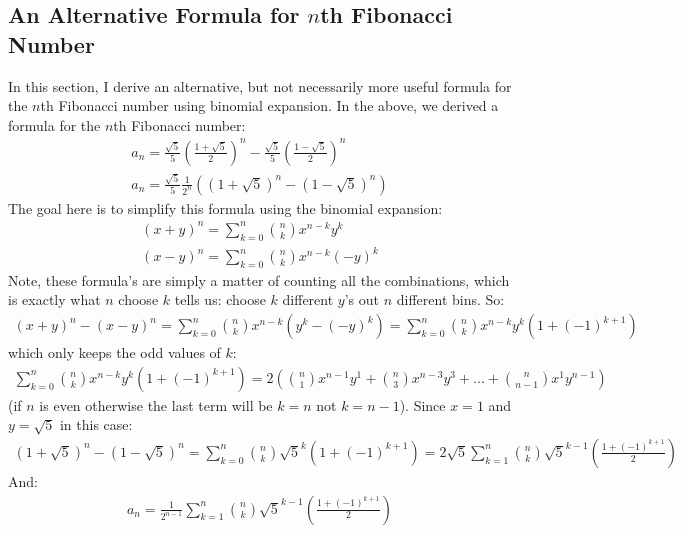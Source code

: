 \documentclass{article}
\begin{document}
\subsection*{An Alternative Formula for $n$th Fibonacci Number}
In this section, I derive an alternative, but not necessarily more useful formula for the $n$th Fibonacci number using binomial expansion. In the above, we derived a formula for the $n$th Fibonacci number:
\begin{gather*}
	a_{n} = \frac{\sqrt{5}}{5}\left(\frac{1 + \sqrt{5}}{2}\right)^{n} -\frac{\sqrt{5}}{5}\left(\frac{1 - \sqrt{5}}{2}\right)^{n}\\
	a_{n} = \frac{\sqrt{5}}{5}\frac{1}{2^{n}}\left(\left(1 + \sqrt{5}\right)^{n} - \left(1 - \sqrt{5}\right)^{n}\right) 
\end{gather*}
The goal here is to simplify this formula using the binomial expansion:
\begin{gather*}
	(x + y)^{n} = \sum_{k = 0}^{n}{n \choose k}x^{n - k}y^{k}\\
	(x - y)^{n} = \sum_{k = 0}^{n}{n \choose k}x^{n - k}(-y)^{k}
\end{gather*}
Note, these formula's are simply a matter of counting all the combinations, which is exactly what $n$ choose $k$ tells us: choose $k$ different $y$'s out $n$ different bins. So:
\begin{gather*}
	(x + y)^{n} - (x - y)^{n} = \sum_{k = 0}^{n}{n \choose k}x^{n - k}\left(y^{k} - (-y)^{k}\right) = \sum_{k = 0}^{n}{n \choose k}x^{n - k}y^{k}\left(1 + (-1)^{k + 1}\right)
\end{gather*}
which only keeps the odd values of $k$:
\begin{gather*}
	\sum_{k = 0}^{n}{n \choose k}x^{n - k}y^{k}\left(1 + (-1)^{k + 1}\right) = 2\left({n \choose 1}x^{n - 1}y^{1} + {n \choose 3}x^{n - 3}y^{3} + ... + {n \choose n - 1}x^{1}y^{n - 1}\right)
\end{gather*}
(if $n$ is even otherwise the last term will be $k = n$ not $k = n - 1$). Since $x = 1$ and $y = \sqrt{5}$ in this case:
\begin{gather*}
	\left(1 + \sqrt{5}\right)^{n} - \left(1 - \sqrt{5}\right)^{n} = \sum_{k = 0}^{n}{n \choose k}\sqrt{5}^{k}\left(1 + (-1)^{k + 1}\right) = 2\sqrt{5}\sum_{k = 1}^{n}{n \choose k}\sqrt{5}^{k - 1}\left(\frac{1 + (-1)^{k + 1}}{2}\right)
\end{gather*}
And:
\begin{gather*}
	a_{n} = \frac{1}{2^{n - 1}}\sum_{k = 1}^{n}{n \choose k}\sqrt{5}^{k - 1}\left(\frac{1 + (-1)^{k + 1}}{2}\right)
\end{gather*}
\end{document}
